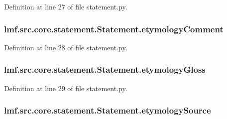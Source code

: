 Definition at line 27 of file statement.\+py.

\hypertarget{classlmf_1_1src_1_1core_1_1statement_1_1_statement_a25f9127cf2fe1017c53a3ccb57570352}{
\subsubsection[{etymology\+Comment}]{\setlength{\rightskip}{0pt plus 5cm}lmf.\+src.\+core.\+statement.\+Statement.\+etymology\+Comment}}\label{classlmf_1_1src_1_1core_1_1statement_1_1_statement_a25f9127cf2fe1017c53a3ccb57570352}


Definition at line 28 of file statement.\+py.

\hypertarget{classlmf_1_1src_1_1core_1_1statement_1_1_statement_a7d9d96cae746848b83b4ae8516c92bee}{
\subsubsection[{etymology\+Gloss}]{\setlength{\rightskip}{0pt plus 5cm}lmf.\+src.\+core.\+statement.\+Statement.\+etymology\+Gloss}}\label{classlmf_1_1src_1_1core_1_1statement_1_1_statement_a7d9d96cae746848b83b4ae8516c92bee}


Definition at line 29 of file statement.\+py.

\hypertarget{classlmf_1_1src_1_1core_1_1statement_1_1_statement_adeefdc77c6ff898b8adba4ef2a946af3}{
\subsubsection[{etymology\+Source}]{\setlength{\rightskip}{0pt plus 5cm}lmf.\+src.\+core.\+statement.\+Statement.\+etymology\+Source}}\label{classlmf_1_1src_1_1core_1_1statement_1_1_statement_adeefdc77c6ff898b8adba4ef2a946af3}


